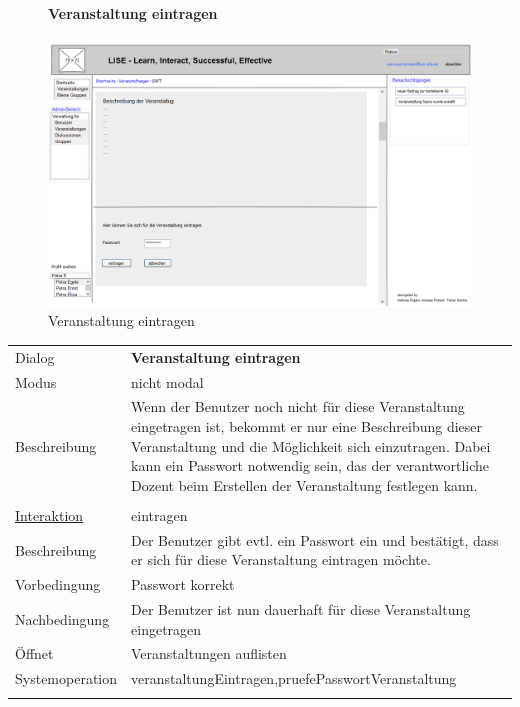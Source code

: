\documentclass[12pt,a4paper]{article}
\begin{document}
{\begin{figure}[H]
	\centering
	\paragraph{Veranstaltung eintragen}
	\includegraphics[width=\textwidth]{Bilder/Mockups/GUI/VeranstaltungEintragen.png}
	\caption{Veranstaltung eintragen}
	\label{VeranstaltungEintragen}
\end{figure}

\begin{tabular}{l p{12cm}}
Dialog 	 & \textbf{Veranstaltung eintragen} \\ 
Modus & nicht modal\\ 
Beschreibung   	 & Wenn der Benutzer noch nicht für diese Veranstaltung eingetragen ist, bekommt er nur eine Beschreibung dieser Veranstaltung und die Möglichkeit sich einzutragen. Dabei kann ein Passwort notwendig sein, das der verantwortliche Dozent beim Erstellen der Veranstaltung festlegen kann.\\\\ 

\underline{Interaktion}  	 & eintragen\\ 
Beschreibung   	 & Der Benutzer gibt evtl. ein Passwort ein und bestätigt, dass er sich für diese Veranstaltung eintragen möchte.  \\
Vorbedingung	 & Passwort korrekt \\
Nachbedingung	 & Der Benutzer ist nun dauerhaft für diese Veranstaltung eingetragen \\
Öffnet			 & \glqq Veranstaltungen auflisten\grqq \\
Systemoperation & veranstaltungEintragen,pruefePasswortVeranstaltung\\\\
\end{tabular}\\\\

}
\end{document}
